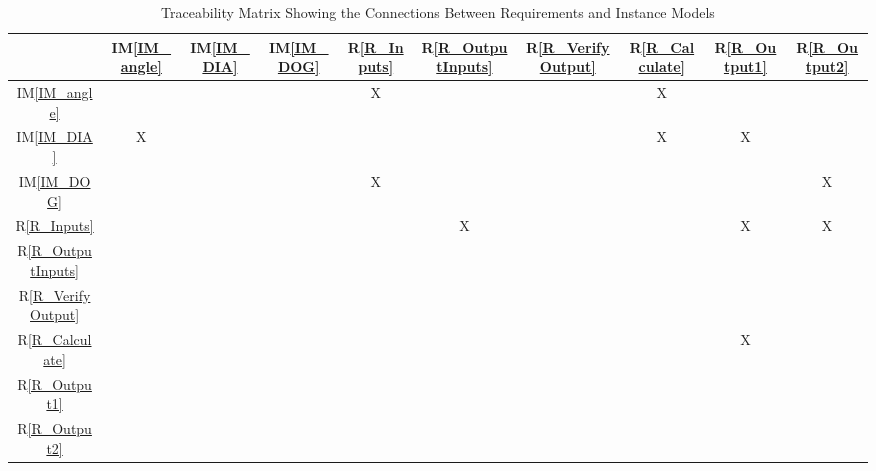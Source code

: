 \documentclass[12pt]{article}
\newcommand{\iref}[1]{IM\ref{#1}}
\newcommand{\rref}[1]{R\ref{#1}}
\begin{document}
\begin{table}[h!]
\centering
\begin{tabular}{|c|c|c|c|c|c|c|c|c|c|}
\hline
	& \iref{IM_angle}& \iref{IM_DIA}& \iref{IM_DOG}& \rref{R_Inputs}& \rref{R_OutputInputs}& \rref{R_VerifyOutput}& \rref{R_Calculate}& \rref{R_Output1}& \rref{R_Output2} \\
\hline
\iref{IM_angle}            & & & & X& & & X& &\\ \hline
\iref{IM_DIA}            & X& & & & & & X& X&\\ \hline
\iref{IM_DOG}          & & & & X& & & & &X\\ \hline
\rref{R_Inputs}          & & & & & X& & & X&X\\ \hline
\rref{R_OutputInputs}     & & & & & & & & &\\ \hline
\rref{R_VerifyOutput}    & & & & & & & & &\\ \hline
\rref{R_Calculate}   & & & & & & & & X&\\ \hline
\rref{R_Output1}  & & & & & & & & &\\ \hline
\rref{R_Output2}  & & & & & & & & &\\ \hline
\end{tabular}
\caption{Traceability Matrix Showing the Connections Between Requirements and Instance Models}
\label{Table:R_trace}
\end{table}


\end{document}
